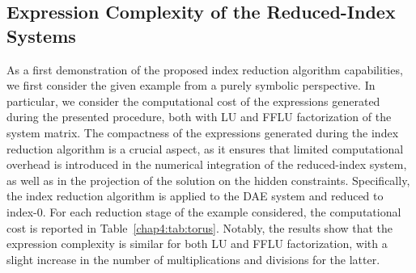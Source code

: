 \subsection{Expression Complexity of the Reduced-Index Systems}
\label{chap4:sec:daes_complexity}

As a first demonstration of the proposed index reduction algorithm capabilities, we first consider the given example from a purely symbolic perspective. In particular, we consider the computational cost of the expressions generated during the presented procedure, both with \ac{LU} and \ac{FFLU} factorization of the system matrix. The compactness of the expressions generated during the index reduction algorithm is a crucial aspect, as it ensures that limited computational overhead is introduced in the numerical integration of the reduced-index system, as well as in the projection of the solution on the hidden constraints. Specifically, the index reduction algorithm is applied to the \ac{DAE} system and reduced to index-0. For each reduction stage of the example considered, the computational cost is reported in Table~\ref{chap4:tab:torus}. Notably, the results show that the expression complexity is similar for both \ac{LU} and \ac{FFLU} factorization, with a slight increase in the number of multiplications and divisions for the latter.

